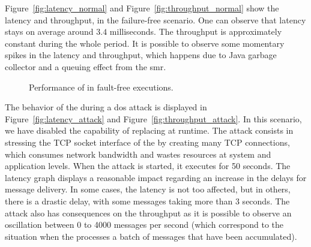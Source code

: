 Figure~\ref{fig:latency_normal} and Figure~\ref{fig:throughput_normal} show the latency and throughput, in the failure-free scenario.
One can observe that latency stays on average around $3.4$ milliseconds.
The throughput is approximately constant during the whole period.
It is possible to observe some momentary spikes in the latency and throughput, which happens due to Java garbage collector and a queuing effect from the \gls{smr}.

\begin{figure}[h]

\hspace{-5mm}
\caption{Performance of \sieveq in fault-free executions.}
\end{figure}




The behavior of the \sieveq during a \gls{dos} attack is displayed in Figure~\ref{fig:latency_attack} and Figure~\ref{fig:throughput_attack}.
In this scenario, we have disabled the \sieveq capability of replacing \presieves at runtime.
The attack consists in stressing the TCP socket interface of the \presieves by creating many TCP connections, which consumes network bandwidth and wastes resources at system and application levels. When the attack is started, it executes for 50 seconds. The latency graph displays a reasonable impact regarding an increase in the delays for message delivery. 
In some cases, the latency is not too affected, but in others, there is a drastic delay, with some messages taking more than 3 seconds.
The attack also has consequences on the throughput as it is possible to observe an oscillation between 0 to 4000 messages per second (which correspond to the situation when the \postsieve processes a batch of messages that have been accumulated).


